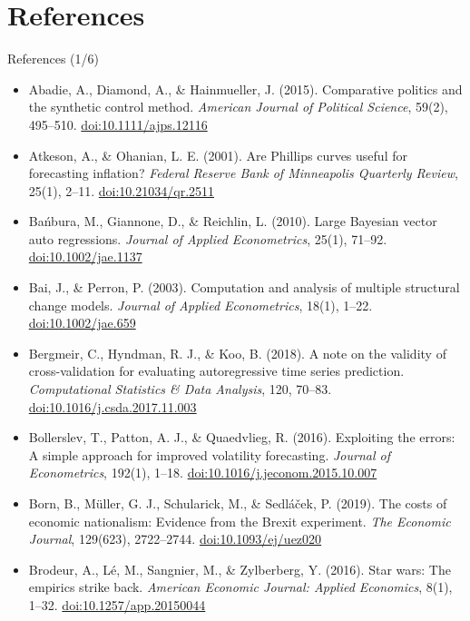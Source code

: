 \section{References}

\begin{frame}{References (1/6)}
\itemsize{\tiny}
\begin{itemize}
    \item Abadie, A., Diamond, A., \& Hainmueller, J. (2015). Comparative politics and the synthetic control method. \textit{American Journal of Political Science}, 59(2), 495--510. \href{https://doi.org/10.1111/ajps.12116}{doi:10.1111/ajps.12116}
    \item Atkeson, A., \& Ohanian, L. E. (2001). Are Phillips curves useful for forecasting inflation? \textit{Federal Reserve Bank of Minneapolis Quarterly Review}, 25(1), 2--11. \href{https://doi.org/10.21034/qr.2511}{doi:10.21034/qr.2511}
    \item Bańbura, M., Giannone, D., \& Reichlin, L. (2010). Large Bayesian vector auto regressions. \textit{Journal of Applied Econometrics}, 25(1), 71--92. \href{https://doi.org/10.1002/jae.1137}{doi:10.1002/jae.1137}
    \item Bai, J., \& Perron, P. (2003). Computation and analysis of multiple structural change models. \textit{Journal of Applied Econometrics}, 18(1), 1--22. \href{https://doi.org/10.1002/jae.659}{doi:10.1002/jae.659}
    \item Bergmeir, C., Hyndman, R. J., \& Koo, B. (2018). A note on the validity of cross-validation for evaluating autoregressive time series prediction. \textit{Computational Statistics \& Data Analysis}, 120, 70--83. \href{https://doi.org/10.1016/j.csda.2017.11.003}{doi:10.1016/j.csda.2017.11.003}
    \item Bollerslev, T., Patton, A. J., \& Quaedvlieg, R. (2016). Exploiting the errors: A simple approach for improved volatility forecasting. \textit{Journal of Econometrics}, 192(1), 1--18. \href{https://doi.org/10.1016/j.jeconom.2015.10.007}{doi:10.1016/j.jeconom.2015.10.007}
    \item Born, B., Müller, G. J., Schularick, M., \& Sedláček, P. (2019). The costs of economic nationalism: Evidence from the Brexit experiment. \textit{The Economic Journal}, 129(623), 2722--2744. \href{https://doi.org/10.1093/ej/uez020}{doi:10.1093/ej/uez020}
    \item Brodeur, A., Lé, M., Sangnier, M., \& Zylberberg, Y. (2016). Star wars: The empirics strike back. \textit{American Economic Journal: Applied Economics}, 8(1), 1--32. \href{https://doi.org/10.1257/app.20150044}{doi:10.1257/app.20150044}

\end{itemize}
\end{frame}
